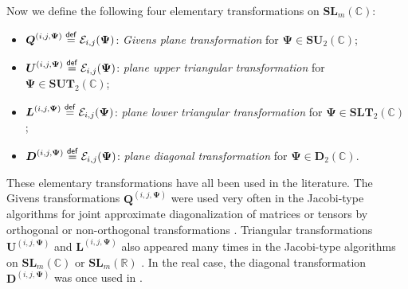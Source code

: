 \documentclass[final,onefignum,onetabnum]{siamart190516}
\newcommand{\matr}[1]{\boldsymbol{#1}}
\newcommand{\eqdef}{\stackrel{\sf def}{=}}
\newcommand{\RR}{\mathbb{R}}
\newcommand{\CC}{\mathbb{C}}
\newcommand{\Gmat}[3]{\matr{Q}^{(#1,#2,#3)}}
\newcommand{\Utwo}{\Psi}
\newcommand{\SUNN}[1]{\mathbf{SU}_{#1}}
\newcommand{\SL}{\mathbf{SL}}
\newcommand{\SUT}{\mathbf{SUT}}
\newcommand{\SLT}{\mathbf{SLT}}
\newcommand{\DT}{\mathbf{D}}
\newcommand{\Lmat}[3]{\matr{L}^{(#1,#2,#3)}}
\newcommand{\Umat}[3]{\matr{U}^{(#1,#2,#3)}}
\newcommand{\Dmat}[3]{\matr{D}^{(#1,#2,#3)}}
\begin{document}
Now we define the following four elementary transformations on $\SL_{m}(\CC)$: 
\begin{itemize}
\item $\Gmat{i}{j}{\matr{\Utwo}}\eqdef\mathcal{E}_{i,j}(\matr{\Utwo})$: \emph{Givens plane transformation} for $\matr{\Utwo} \in \SUNN{2}(\CC)$;
\item $\Umat{i}{j}{\matr{\Utwo}}\eqdef\mathcal{E}_{i,j}(\matr{\Utwo})$: \emph{plane upper triangular transformation} for $\matr{\Utwo} \in \SUT_{2}(\CC)$;
\item $\Lmat{i}{j}{\matr{\Utwo}}\eqdef\mathcal{E}_{i,j}(\matr{\Utwo})$: \emph{plane lower triangular transformation} for $\matr{\Utwo} \in \SLT_{2}(\CC)$;
\item $\Dmat{i}{j}{\matr{\Utwo}}\eqdef\mathcal{E}_{i,j}(\matr{\Utwo})$: \emph{plane diagonal transformation} for $\matr{\Utwo} \in \DT_{2}(\CC)$.
\end{itemize}

\begin{remark}
These elementary transformations have all been used in the literature. The Givens  transformations $\Gmat{i}{j}{\matr{\Utwo}}$ were used very often in the Jacobi-type algorithms for joint approximate diagonalization of matrices or tensors by orthogonal or non-orthogonal transformations  \cite{Como10:book,LUC2017globally,ULC2019,Afsa07:honolulu,afsari2006simple,sorensen2009approximate}. 
Triangular transformations $\Umat{i}{j}{\matr{\Utwo}}$ and  $\Lmat{i}{j}{\matr{\Utwo}}$ also appeared  many times in the Jacobi-type algorithms on $\SL_{m}(\CC)$ or $\SL_{m}(\RR)$ \cite{afsari2004gradient,afsari2006simple,maurandi2013fast,maurandi2014decoupled,maurandi2014jacobi}. 
In the real case, the diagonal transformation $\Dmat{i}{j}{\matr{\Utwo}}$ was once used in \cite{souloumiac2009nonorthogonal}.
\end{remark}
\end{document}
